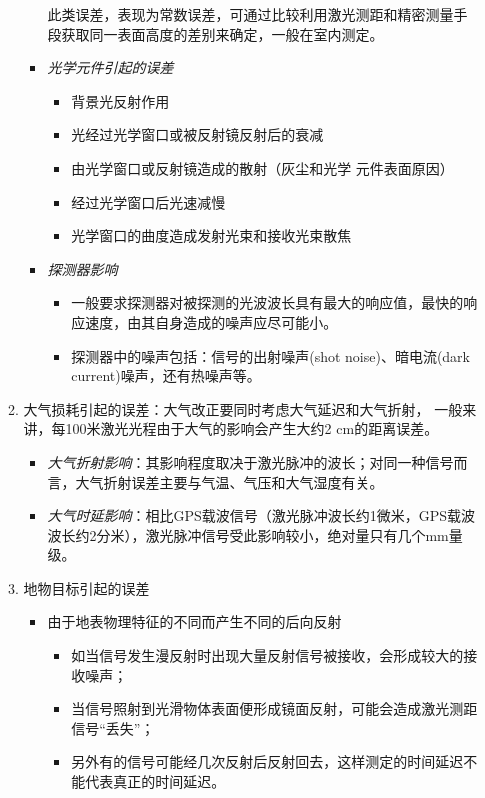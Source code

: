 \begin{enumerate}
\begin{enumerate}
\begin{itemize}
			此类误差，表现为常数误差，可通过比较利用激光测距和精密测量手段获取同一表面高度的差别来确定，一般在室内测定。
			\item \textit{光学元件引起的误差}
			\begin{itemize}
				\item 背景光反射作用
				\item 光经过光学窗口或被反射镜反射后的衰减
				\item 由光学窗口或反射镜造成的散射（灰尘和光学 元件表面原因）
				\item 经过光学窗口后光速减慢
				\item 光学窗口的曲度造成发射光束和接收光束散焦
			\end{itemize} %
			\item \textit{探测器影响}
			\begin{itemize}
				\item 一般要求探测器对被探测的光波波长具有最大的响应值，最快的响应速度，由其自身造成的噪声应尽可能小。
				\item 探测器中的噪声包括：信号的出射噪声(shot noise)、暗电流(dark current)噪声，还有热噪声等。
			\end{itemize} %
		\end{itemize} %
		\item {\cukai 大气损耗引起的误差}：大气改正要同时考虑大气延迟和大气折射，
		一般来讲，每100米激光光程由于大气的影响会产生大约2 cm的距离误差。
		\begin{itemize}
			\item \textit{大气折射影响}：其影响程度取决于激光脉冲的波长；对同一种信号而言，大气折射误差主要与气温、气压和大气湿度有关。
			\item \textit{大气时延影响}：相比GPS载波信号（激光脉冲波长约1微米，GPS载波波长约2分米），激光脉冲信号受此影响较小，绝对量只有几个mm量级。
		\end{itemize} %
	\item {\cukai 地物目标引起的误差}
		\begin{itemize}
			\item 由于地表物理特征的不同而产生不同的后向反射
			\begin{itemize}
				\item 如当信号发生漫反射时出现大量反射信号被接收，会形成较大的接收噪声；
				\item 当信号照射到光滑物体表面便形成镜面反射，可能会造成激光测距信号“丢失”；
				\item 另外有的信号可能经几次反射后反射回去，这样测定的时间延迟不能代表真正的时间延迟。

\end{itemize}
\end{itemize}
\end{enumerate}
\end{enumerate}
